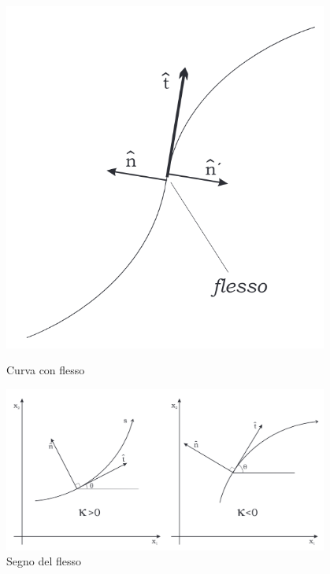 \begin{figure}[H]
    \centering
    \begin{minipage}{0.3\textwidth}
        \centering
        \includegraphics[width=0.95\textwidth]{assets/flesso.png}
        \caption{Curva con flesso}
    \end{minipage}%
    \hspace{10pt}
    \begin{minipage}{0.65\textwidth}
        \centering
        \includegraphics[width=0.95\textwidth]{assets/segno_flesso.png}
        \caption{Segno del flesso}
    \end{minipage}
\end{figure}

